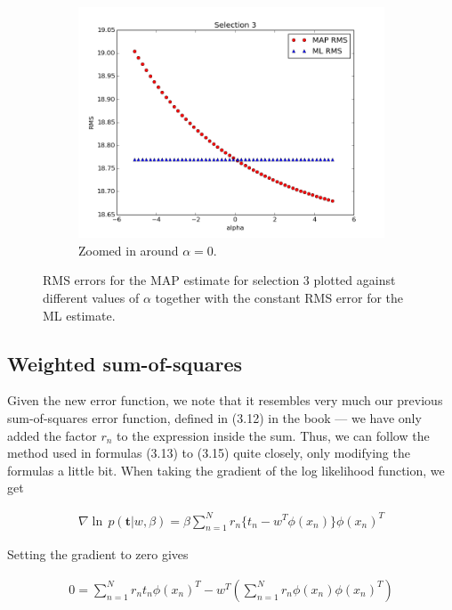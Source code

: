 \documentclass[a4paper]{article}
\begin{document}
\begin{figure}[H]
\begin{adjustwidth}{-7em}{-7em}
    \begin{subfigure}{.32\linewidth}
      \includegraphics[width=\linewidth]{figures/alpha_vs_rms_selection3c.png}
      \caption{Zoomed in around $\alpha = 0$.}
      \label{fig:alpha_vs_rms_selection3c}
    \end{subfigure}
  \end{adjustwidth}
  \caption{RMS errors for the MAP estimate for selection 3 plotted against different values of $\alpha$ together with the constant RMS error for the ML estimate.}
  \label{fig:alpha_vs_rms_selection3}
\end{figure}

\subsection{Weighted sum-of-squares}
Given the new error function, we note that it resembles very much our previous sum-of-squares error function, defined in (3.12) in the book --- we have only added the factor $r_n$ to the expression inside the sum. Thus, we can follow the method used in formulas (3.13) to (3.15) quite closely, only modifying the formulas a little bit. When taking the gradient of the log likelihood function, we get

\begin{align*} %
\nabla \operatorname{ln} \, p(\bm{t} | w, \beta) = \beta \sum_{n=1}^{N} r_n \{ t_n - w^T \phi(x_n) \} \phi(x_n)^T
\end{align*}

Setting the gradient to zero gives

\begin{align*} %
0 = \sum_{n=1}^{N} r_n t_n \phi(x_n)^T - w^T \left( \sum_{n=1}^{N} r_n \phi(x_n) \phi(x_n)^T \right)
\end{align*}
\end{document}
